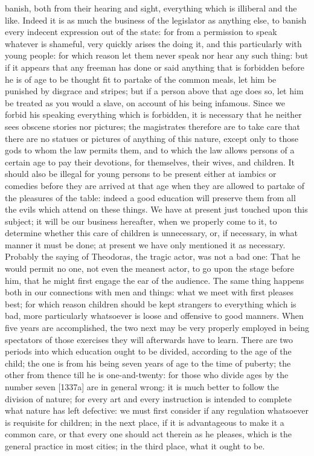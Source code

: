 banish, both from their hearing and sight, everything which is illiberal
and the like. Indeed it is as much the business of the legislator as
anything else, to banish every indecent expression out of the state: for
from a permission to speak whatever is shameful, very quickly arises the
doing it, and this particularly with young people: for which reason let
them never speak nor hear any such thing: but if it appears that any
freeman has done or said anything that is forbidden before he is of age to
be thought fit to partake of the common meals, let him be punished by
disgrace and stripes; but if a person above that age does so, let him be
treated as you would a slave, on account of his being infamous. Since we
forbid his speaking everything which is forbidden, it is necessary that he
neither sees obscene stories nor pictures; the magistrates therefore are
to take care that there are no statues or pictures of anything of this
nature, except only to those gods to whom the law permits them, and to
which the law allows persons of a certain age to pay their devotions, for
themselves, their wives, and children. It should also be illegal for young
persons to be present either at iambics or comedies before they are
arrived at that age when they are allowed to partake of the pleasures of
the table: indeed a good education will preserve them from all the evils
which attend on these things. We have at present just touched upon this
subject; it will be our business hereafter, when we properly come to it,
to determine whether this care of children is unnecessary, or, if
necessary, in what manner it must be done; at present we have only
mentioned it as necessary. Probably the saying of Theodoras, the tragic
actor, was not a bad one: That he would permit no one, not even the
meanest actor, to go upon the stage before him, that he might first engage
the ear of the audience. The same thing happens both in our connections
with men and things: what we meet with first pleases best; for which
reason children should be kept strangers to everything which is bad, more
particularly whatsoever is loose and offensive to good manners. When five
years are accomplished, the two next may be very properly employed in
being spectators of those exercises they will afterwards have to learn.
There are two periods into which education ought to be divided, according
to the age of the child; the one is from his being seven years of age to
the time of puberty; the other from thence till he is one-and-twenty: for
those who divide ages by the number seven [1337a] are in general wrong: it
is much better to follow the division of nature; for every art and every
instruction is intended to complete what nature has left defective: we
must first consider if any regulation whatsoever is requisite for
children; in the next place, if it is advantageous to make it a common
care, or that every one should act therein as he pleases, which is the
general practice in most cities; in the third place, what it ought to be.

